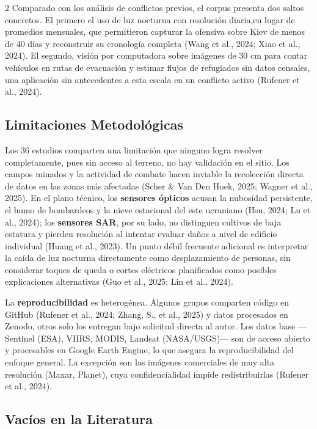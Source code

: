 \documentclass[12pt, a4paper]{article}
\begin{document}
\begin{multicols}{2}
Comparado con los análisis de conflictos previos, el corpus presenta dos saltos concretos. El primero el uso de luz nocturna con resolución diaria,en lugar de promedios mensuales, que permitieron capturar la ofensiva sobre Kiev de menos de 40 días y reconstruir su cronología completa (Wang et al., 2024; Xiao et al., 2024). El segundo, visión por computadora sobre imágenes de 30 cm para contar vehículos en rutas de evacuación y estimar flujos de refugiados sin datos censales, una aplicación sin antecedentes a esta escala en un conflicto activo (Rufener et al., 2024).

\subsection{Limitaciones Metodológicas}

Los 36 estudios comparten una limitación que ninguno logra resolver completamente, pues sin acceso al terreno, no hay validación en el sitio. Los campos minados y la actividad de combate hacen inviable la recolección directa de datos en las zonas más afectadas (Scher \& Van Den Hoek, 2025; Wagner et al., 2025). En el plano técnico, los \textbf{sensores ópticos} acusan la nubosidad persistente, el humo de bombardeos y la nieve estacional del este ucraniano (Hsu, 2024; Lu et al., 2024); los \textbf{sensores SAR}, por su lado, no distinguen cultivos de baja estatura y pierden resolución al intentar evaluar daños a nivel de edificio individual (Huang et al., 2023). Un punto débil frecuente adicional es interpretar la caída de luz nocturna directamente como desplazamiento de personas, sin considerar toques de queda o cortes eléctricos planificados como posibles explicaciones alternativas (Guo et al., 2025; Lin et al., 2024).

La \textbf{reproducibilidad} es heterogénea. Algunos grupos comparten código en GitHub (Rufener et al., 2024; Zhang, S., et al., 2025) y datos procesados en Zenodo, otros solo los entregan bajo solicitud directa al autor. Los datos base —Sentinel (ESA), VIIRS, MODIS, Landsat (NASA/USGS)— son de acceso abierto y procesables en Google Earth Engine, lo que asegura la reproducibilidad del enfoque general. La excepción son las imágenes comerciales de muy alta resolución (Maxar, Planet), cuya confidencialidad impide redistribuirlas (Rufener et al., 2024).

\subsection{Vacíos en la Literatura}


\end{multicols}
\end{document}
